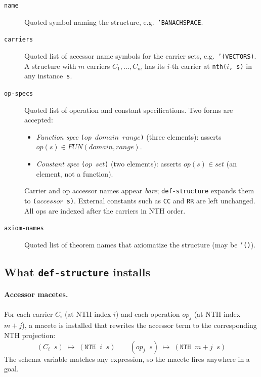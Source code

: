 \documentclass{amsbook}[openany]
\theoremstyle{definition}
\theoremstyle{remark}
\theoremstyle{remark}
\begin{document}
\begin{description}

\item[\texttt{name}]
  Quoted symbol naming the structure, e.g.\ \texttt{'BANACHSPACE}.

\item[\texttt{carriers}]
  Quoted list of accessor name symbols for the carrier sets,
  e.g.\ \texttt{'(VECTORS)}.  A structure with $m$ carriers
  $C_1, \ldots, C_m$ has its $i$-th carrier at \texttt{nth($i$, s)} in
  any instance~\texttt{s}.

\item[\texttt{op-specs}]
  Quoted list of operation and constant specifications.  Two forms are
  accepted:
  \begin{itemize}\setlength\itemsep{2pt}
  \item \emph{Function spec} \texttt{($\mathit{op}$\ $\mathit{domain}$\ $\mathit{range}$)}
    (three elements): asserts
    $\mathit{op}(s) \in \mathit{FUN}(\mathit{domain},\mathit{range})$.
  \item \emph{Constant spec} \texttt{($\mathit{op}$\ $\mathit{set}$)}
    (two elements): asserts $\mathit{op}(s) \in \mathit{set}$ (an
    element, not a function).
  \end{itemize}
  Carrier and op accessor names appear \emph{bare}; \texttt{def-structure}
  expands them to \texttt{($\mathit{accessor}$\ s)}.  External constants
  such as \texttt{CC} and \texttt{RR} are left unchanged.  All ops are
  indexed after the carriers in NTH order.

\item[\texttt{axiom-names}]
  Quoted list of theorem names that axiomatize the structure
  (may be \texttt{'()}).

\end{description}

\subsection{What \texttt{def-structure} installs}

\paragraph{Accessor macetes.}
For each carrier $C_i$ (at NTH index $i$) and each operation
$\mathit{op}_j$ (at NTH index $m+j$), a macete is installed that
rewrites the accessor term to the corresponding NTH projection:
\[
  (C_i\;\; s) \;\longmapsto\; (\texttt{NTH}\;\; i\;\; s)
  \qquad
  (\mathit{op}_j\;\; s) \;\longmapsto\; (\texttt{NTH}\;\; m{+}j\;\; s)
\]
The schema variable matches any expression, so the macete fires anywhere
in a goal.
\end{document}
